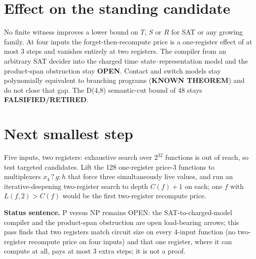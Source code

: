 \documentclass[11pt]{article}
\begin{document}
\section*{Effect on the standing candidate}
No finite witness improves a lower bound on $T$, $S$ or $R$ for SAT or any growing family. At four inputs the forget-then-recompute price is a one-register effect of at most 3 steps and vanishes entirely at two registers. The compiler from an arbitrary SAT decider into the charged time--state--representation model and the product-span obstruction stay \textbf{OPEN}. Contact and switch models stay polynomially equivalent to branching programs (\textbf{KNOWN THEOREM}) and do not close that gap. The D(4,8) semantic-cut bound of 48 stays \textbf{FALSIFIED/RETIRED}.

\section*{Next smallest step}
Five inputs, two registers: exhaustive search over $2^{32}$ functions is out of reach, so test targeted candidates. Lift the 128 one-register price-3 functions to multiplexers $x_4\,?\,g:h$ that force three simultaneously live values, and run an iterative-deepening two-register search to depth $C(f)+1$ on each; one $f$ with $L(f,2)>C(f)$ would be the first two-register recompute price.

\bigskip
\noindent\textbf{Status sentence.} P versus NP remains OPEN: the SAT-to-charged-model compiler and the product-span obstruction are open load-bearing arrows; this pass finds that two registers match circuit size on every 4-input function (no two-register recompute price on four inputs) and that one register, where it can compute at all, pays at most 3 extra steps; it is not a proof.
\end{document}
